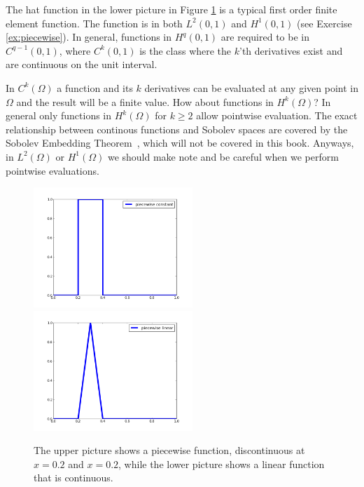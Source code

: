 The hat function in the lower picture in Figure \ref{fig:piecewise} is a typical
first order finite element function. The function is in both $L^2(0,1)$ and $H^1(0,1)$ (see
Exercise \ref{ex:piecewise}).         
In general, functions in $H^q(0,1)$ are required to be in $C^{q-1}(0,1)$, where $C^k(0,1)$ is the
class  where the $k$'th derivatives exist and
are continuous on the unit interval.   

\begin{remark}
In $C^k(\Omega)$ a function and its $k$ derivatives can be evaluated at any given point in $\Omega$ and  
the result will be a finite value. How about functions in $H^k(\Omega)$? In general only functions
in $H^k(\Omega)$ for $k\ge 2$ allow pointwise evaluation. The exact relationship between 
continous functions and Sobolev spaces are covered by the  Sobolev Embedding Theorem~\cite{evans2022partial}, which will not 
be covered in this book. 
Anyways, in $L^2(\Omega)$ or $H^1(\Omega)$ we should make note and be careful when we perform pointwise evaluations. 
\end{remark}


\begin{figure}
\begin{center}
\includegraphics[width=6cm]{chapters/SobolevCrash/pc.png}
\includegraphics[width=6cm]{chapters/SobolevCrash/pl.png}
\caption{The upper picture shows a piecewise function, discontinuous at $x=0.2$ and $x=0.2$, while
the lower picture shows a linear function that is continuous. }  
\label{fig:piecewise}
\end{center}
\end{figure}

